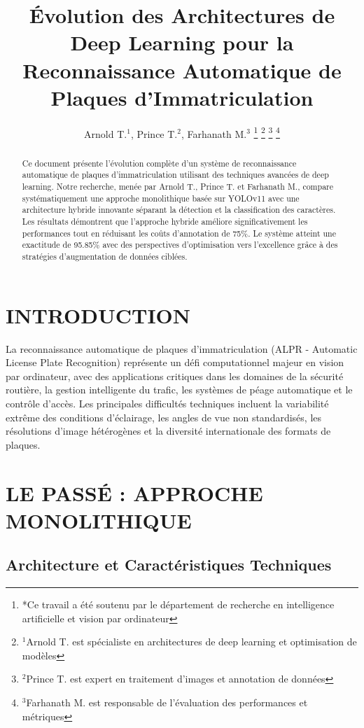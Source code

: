 \documentclass[letterpaper, 10 pt, conference]{ieeeconf}
\title{\LARGE \bf
Évolution des Architectures de Deep Learning pour la Reconnaissance Automatique de Plaques d'Immatriculation
}
\author{Arnold T.$^{1}$, Prince T.$^{2}$, Farhanath M.$^{3}$%
\thanks{*Ce travail a été soutenu par le département de recherche en intelligence artificielle et vision par ordinateur}%
\thanks{$^{1}$Arnold T. est spécialiste en architectures de deep learning et optimisation de modèles}%
\thanks{$^{2}$Prince T. est expert en traitement d'images et annotation de données}%
\thanks{$^{3}$Farhanath M. est responsable de l'évaluation des performances et métriques}%
}
\begin{document}
\maketitle
\thispagestyle{empty}
\pagestyle{empty}

\begin{abstract}

Ce document présente l'évolution complète d'un système de reconnaissance automatique de plaques d'immatriculation utilisant des techniques avancées de deep learning. Notre recherche, menée par Arnold T., Prince T. et Farhanath M., compare systématiquement une approche monolithique basée sur YOLOv11 avec une architecture hybride innovante séparant la détection et la classification des caractères. Les résultats démontrent que l'approche hybride améliore significativement les performances tout en réduisant les coûts d'annotation de 75\%. Le système atteint une exactitude de 95.85\% avec des perspectives d'optimisation vers l'excellence grâce à des stratégies d'augmentation de données ciblées.

\end{abstract}

\section{INTRODUCTION}

La reconnaissance automatique de plaques d'immatriculation (ALPR - Automatic License Plate Recognition) représente un défi computationnel majeur en vision par ordinateur, avec des applications critiques dans les domaines de la sécurité routière, la gestion intelligente du trafic, les systèmes de péage automatique et le contrôle d'accès. Les principales difficultés techniques incluent la variabilité extrême des conditions d'éclairage, les angles de vue non standardisés, les résolutions d'image hétérogènes et la diversité internationale des formats de plaques.


\section{LE PASSÉ : APPROCHE MONOLITHIQUE}

\subsection{Architecture et Caractéristiques Techniques}
\end{document}
